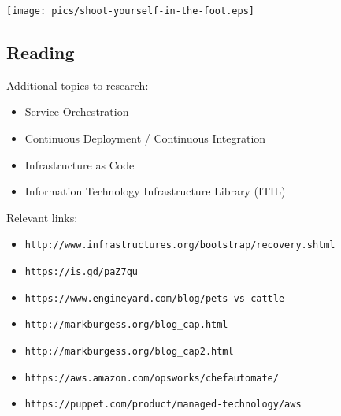 \documentclass[xga]{xdvislides}
\begin{document}
\begin{center}
	\texttt{[image: pics/shoot-yourself-in-the-foot.eps]} \\
\end{center}


\subsection{Reading}

Additional topics to research:
\begin{itemize}
	\item Service Orchestration
	\item Continuous Deployment / Continuous Integration
	\item Infrastructure as Code
	\item Information Technology Infrastructure Library (ITIL)
\end{itemize}
\vspace{.25in}

Relevant links:
\begin{itemize}
	\item {\tt http://www.infrastructures.org/bootstrap/recovery.shtml}
	\item {\tt https://is.gd/paZ7qu}
	\item {\tt https://www.engineyard.com/blog/pets-vs-cattle}
	\item {\tt http://markburgess.org/blog\_cap.html}
	\item {\tt http://markburgess.org/blog\_cap2.html}
	\item {\tt https://aws.amazon.com/opsworks/chefautomate/}
	\item {\tt https://puppet.com/product/managed-technology/aws}
\end{itemize}
\end{document}
